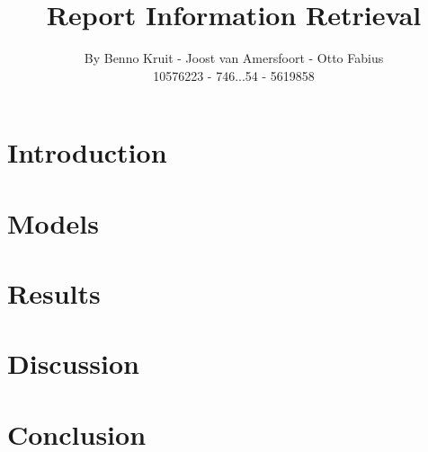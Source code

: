 \documentclass{article}
\begin{document}
\title{Report Information Retrieval}
\author{By Benno Kruit - Joost van Amersfoort - Otto Fabius \\ 10576223 - 746...54 - 5619858}
\maketitle

\section*{Introduction}

\section*{Models}

\section*{Results}

\section*{Discussion}

\section*{Conclusion}
\end{document}
